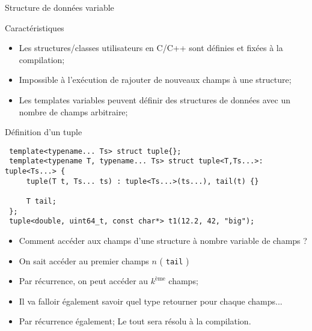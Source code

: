\documentclass[handout,10pt]{beamer}
\begin{document}
\begin{frame}[fragile]{Structure de données variable}
\tiny
\begin{block}{Caractéristiques}
\begin{itemize}
 \item Les structures/classes utilisateurs en C/C++ sont définies et fixées à la compilation;
 \item Impossible à l'exécution de rajouter de nouveaux champs à une structure;
 \item Les templates variables peuvent définir des structures de données avec un nombre de champs arbitraire;
 \end{itemize}
 \end{block}
 
\begin{exampleblock}{Définition d'un tuple}
\begin{lstlisting}
 template<typename... Ts> struct tuple{};
 template<typename T, typename... Ts> struct tuple<T,Ts...>: tuple<Ts...> {
     tuple(T t, Ts... ts) : tuple<Ts...>(ts...), tail(t) {}

     T tail;
 };
 tuple<double, uint64_t, const char*> t1(12.2, 42, "big");
 \end{lstlisting}
\begin{itemize} 
\item Comment accéder aux champs d'une structure à nombre variable de champs ?
\item On sait accéder au premier champs $n$ ( \lstinline$tail$ )
\item Par récurrence, on peut accéder au $k^{\mbox{ème}}$ champs;
\item Il va falloir également savoir quel type retourner pour chaque champs...
\item Par récurrence également; Le tout sera résolu à la compilation.
\end{itemize}
\end{exampleblock}

\end{frame}
\end{document}
